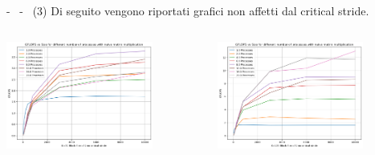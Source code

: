 \documentclass[compress]{beamer}
\begin{document}
\begin{frame}{\secname \text{ }- \subsecname\ \text{ }- \subsubsecname\ (3)}
    Di seguito vengono riportati grafici non affetti dal critical stride.
    \begin{columns}
            \begin{minipage}{1\textwidth}
                \centering
                \begin{adjustbox}{margin=0cm 0cm 0cm 0cm, center} %
                    \includegraphics[width=0.75\textwidth, frame]{resources/rect_k32_naive_nocrit.png}
                \end{adjustbox}
                \begin{adjustbox}{margin=0cm 0cm 0cm 0.1cm, center} %
                    \includegraphics[width=0.75\textwidth, frame]{resources/rect_k128_naive_nocrit.png}
                \end{adjustbox}
            \end{minipage}
            \begin{minipage}{1\textwidth}

\end{minipage}
\end{columns}
\end{frame}
\end{document}
